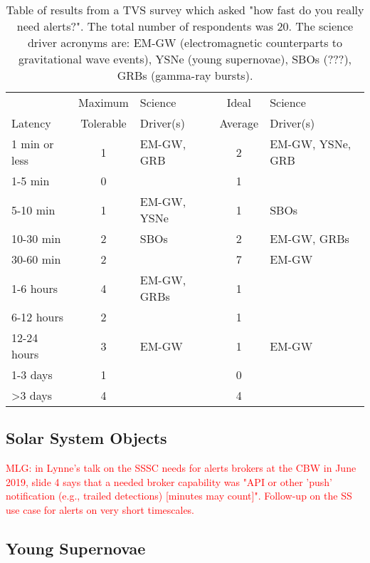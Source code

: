 \documentclass[DM,lsstdraft,authoryear,toc]{lsstdoc}
\begin{document}
\begin{table}[h]%
\caption{Table of results from a TVS survey which asked "how fast do you really need alerts?". The total number of respondents was 20. The science driver acronyms are: EM-GW (electromagnetic counterparts to gravitational wave events), YSNe (young supernovae), SBOs (???), GRBs (gamma-ray bursts). \label{tab:tvs}}
\begin{center}
\begin{tabular}{|l|cl|cl|}
\hline
             & Maximum & Science & Ideal       & Science \\
Latency & Tolerable  & Driver(s) &  Average & Driver(s) \\
\hline
1 min or less & 1 & EM-GW, GRB  & 2 & EM-GW, YSNe, GRB \\
1-5 min         & 0 &                          & 1 &                                   \\
5-10 min       & 1 & EM-GW, YSNe & 1 & SBOs \\
10-30 min     & 2 & SBOs               & 2 & EM-GW, GRBs \\
30-60 min     & 2 &                          & 7 & EM-GW  \\
1-6 hours     & 4 & EM-GW, GRBs & 1 &  \\
6-12 hours   & 2 &                          & 1 &  \\
12-24 hours & 3 & EM-GW            & 1 & EM-GW \\
1-3 days      & 1 &                           & 0 &  \\
>3 days       & 4 &                           & 4 &  \\
\hline
\end{tabular}
\end{center}
\label{default}
\end{table}%


\subsection{Solar System Objects}\label{ssec:latency_sso}

\textcolor{red}{MLG: in Lynne's talk on the SSSC needs for alerts brokers at the CBW in June 2019, slide 4 says that a needed broker capability was "API or other 'push' notification (e.g., trailed detections) [minutes may count]". Follow-up on the SS use case for alerts on very short timescales.}


\subsection{Young Supernovae}\label{ssec:latency_ysne}
\end{document}
